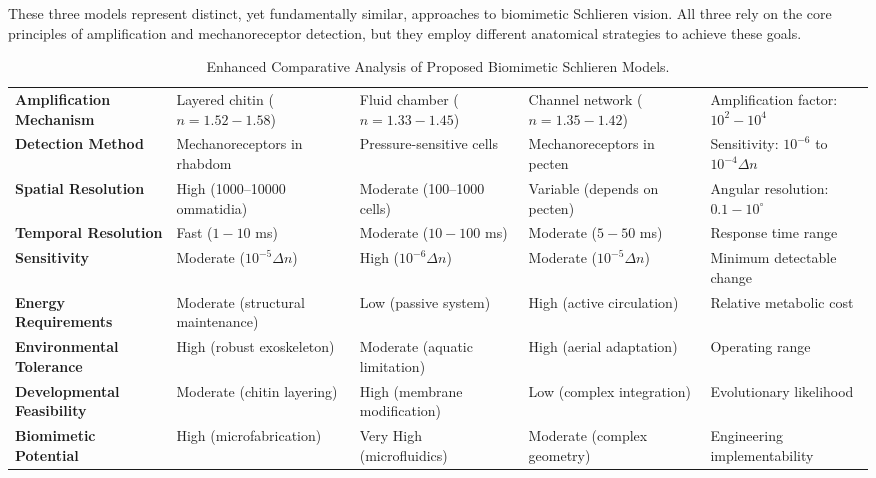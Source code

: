 \documentclass[11pt]{article}
\begin{document}
These three models represent distinct, yet fundamentally similar, approaches to biomimetic Schlieren vision. All three rely on the core principles of amplification and mechanoreceptor detection, but they employ different anatomical strategies to achieve these goals.

\begin{table}[htbp]
\centering
\caption{Enhanced Comparative Analysis of Proposed Biomimetic Schlieren Models.}
\label{tab:enhanced_comparative}
\scriptsize
\begin{tabularx}{\textwidth}{@{}L L L L L@{}}
\toprule
{} &  &  &  &  \\
\midrule
\textbf{Amplification Mechanism} & Layered chitin ($n=1.52-1.58$) & Fluid chamber ($n=1.33-1.45$) & Channel network ($n=1.35-1.42$) & Amplification factor: $10^2-10^4$ \\
\addlinespace %
\textbf{Detection Method} & Mechanoreceptors in rhabdom & Pressure-sensitive cells & Mechanoreceptors in pecten & Sensitivity: $10^{-6}$ to $10^{-4} \Delta n$ \\
\addlinespace %

\textbf{Spatial Resolution} & High (\num{1000}--\num{10000} ommatidia) & Moderate (\num{100}--\num{1000} cells) & Variable (depends on pecten) & Angular resolution: $0.1-10^\circ$ \\
\addlinespace %

\textbf{Temporal Resolution} & Fast ($1-10$ ms) & Moderate ($10-100$ ms) & Moderate ($5-50$ ms) & Response time range \\
\addlinespace %

\textbf{Sensitivity} & Moderate ($10^{-5} \Delta n$) & High ($10^{-6} \Delta n$) & Moderate ($10^{-5} \Delta n$) & Minimum detectable change \\
\addlinespace %

\textbf{Energy Requirements} & Moderate (structural maintenance) & Low (passive system) & High (active circulation) & Relative metabolic cost \\
\addlinespace %

\textbf{Environmental Tolerance} & High (robust exoskeleton) & Moderate (aquatic limitation) & High (aerial adaptation) & Operating range \\
\addlinespace %

\textbf{Developmental Feasibility} & Moderate (chitin layering) & High (membrane modification) & Low (complex integration) & Evolutionary likelihood \\
\addlinespace %

\textbf{Biomimetic Potential} & High (microfabrication) & Very High (microfluidics) & Moderate (complex geometry) & Engineering implementability \\
\bottomrule
\end{tabularx}
\end{table}
\end{document}
